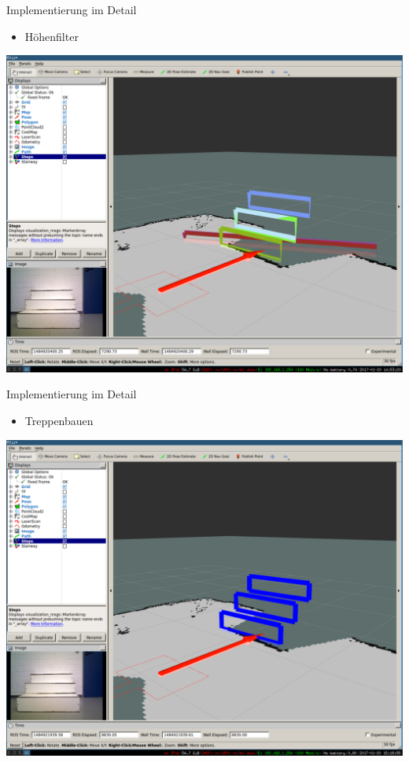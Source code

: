 \documentclass[18pt]{beamer}
\begin{document}
\begin{frame}{Implementierung im Detail}
	\begin{itemize}
		\item Höhenfilter
	\end{itemize}
	\begin{center}
		\includegraphics[scale=0.16]{images/ransac02.pdf}
	\end{center}
\end{frame}

\begin{frame}{Implementierung im Detail}
	\begin{itemize}
		\item Treppenbauen
	\end{itemize}
	\begin{center}
		\includegraphics[scale=0.16]{images/ransac03.pdf}
	\end{center}
\end{frame}
\end{document}
